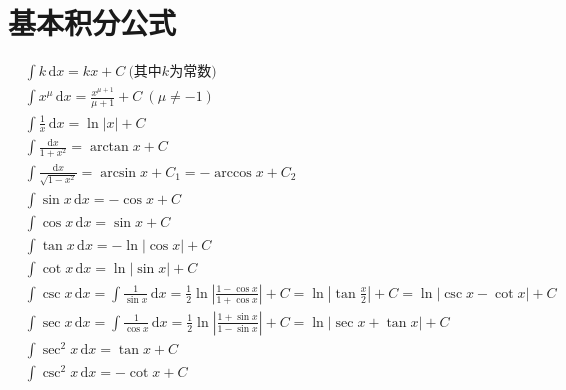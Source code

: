 \documentclass[10pt,a4paper]{article}
\begin{document}
\section{基本积分公式}
\begin{align}
     & \int k \,\mathrm{d}x=kx+C   \ \mbox{(其中}k\mbox{为常数)}                                                              \\[7pt]
     & \int x^\mu\,\mathrm{d}x=\frac{x^{\mu+1}}{\mu+1}+C\ (\mu\neq-1)                                                         \\[7pt]
     & \int \frac{1}{x}\,\mathrm{d}x=\ln|x|+C                                                                                 \\[7pt]
     & \int\frac{\mathrm{d}x}{1+x^2}=\arctan x+C                                                                              \\[7pt]
     & \int\frac{\mathrm{d}x}{\sqrt{1-x^2}}=\arcsin x+C_1=-\arccos x+C_2                                                      \\[7pt]
     & \int \sin x\,\mathrm{d}x=-\cos x+C                                                                                     \\[7pt]
     & \int\cos x \,\mathrm{d}x=\sin x +C                                                                                     \\[7pt]
     & \int\tan x\,\mathrm{d}x=-\ln |\cos x|+C                                                                                \\[7pt]
     & \int\cot x\,\mathrm{d}x=\ln |\sin x|+C                                                                                 \\[7pt]
     & \int\csc x\,\mathrm{d}x=\int\frac{1}{\sin{x}}\,\mathrm{d}x=\frac{1}{2}
    \ln{\left|\frac{1-\cos{x}}{1+\cos{x}}\right|}+C=\ln{\left|\tan{\frac{x}{2}}\right|}+C=\ln{\left|\csc{x}-\cot{x}\right|}+C \\[7pt]
     & \int\sec x\,\mathrm{d}x=\int\frac{1}{\cos{x}}\,\mathrm{d}x=\frac{1}{2}
    \ln{\left|\frac{1+\sin{x}}{1-\sin{x}}\right|}+C=\ln{\left|\sec{x}+\tan{x}\right|}+C                                       \\[7pt]
     & \int\sec^2 x\,\mathrm{d}x=\tan x +C                                                                                    \\[7pt]
     & \int \csc^2 x\,\mathrm{d}x=-\cot x +C                                                                                  \\[7pt]

\end{align}
\end{document}
